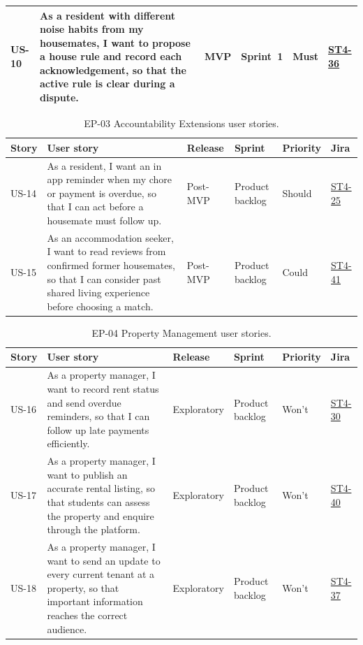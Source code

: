 \documentclass[11pt,a4paper]{article}
\begin{document}
\begin{table}[H]
\begin{tabularx}{\textwidth}{@{}L{1.05cm}Y L{1.75cm}L{1.7cm}L{1.2cm}L{1.1cm}@{}}
        US-10 & As a resident with different noise habits from my housemates, I want to propose a house rule and record each acknowledgement, so that the active rule is clear during a dispute. & MVP & Sprint~1 & Must & \href{https://unsw-team-desn-seng2026.atlassian.net/browse/ST4-36}{ST4-36}\\
        \bottomrule
    \end{tabularx}
    \label{tabstoriesep02}
\end{table}

\begin{table}[H]
    \centering
    \footnotesize
    \caption{EP-03 Accountability Extensions user stories.}
    \begin{tabularx}{\textwidth}{@{}L{1.05cm}Y L{1.75cm}L{1.7cm}L{1.2cm}L{1.1cm}@{}}
        \toprule
        Story & User story & Release & Sprint & Priority & Jira\\
        \midrule
        US-14 & As a resident, I want an in app reminder when my chore or payment is overdue, so that I can act before a housemate must follow up. & Post-MVP & Product backlog & Should & \href{https://unsw-team-desn-seng2026.atlassian.net/browse/ST4-25}{ST4-25}\\
        US-15 & As an accommodation seeker, I want to read reviews from confirmed former housemates, so that I can consider past shared living experience before choosing a match. & Post-MVP & Product backlog & Could & \href{https://unsw-team-desn-seng2026.atlassian.net/browse/ST4-41}{ST4-41}\\
        \bottomrule
    \end{tabularx}
    \label{tabstoriesep03}
\end{table}

\begin{table}[H]
    \centering
    \footnotesize
    \caption{EP-04 Property Management user stories.}
    \begin{tabularx}{\textwidth}{@{}L{1.05cm}Y L{1.75cm}L{1.7cm}L{1.2cm}L{1.1cm}@{}}
        \toprule
        Story & User story & Release & Sprint & Priority & Jira\\
        \midrule
        US-16 & As a property manager, I want to record rent status and send overdue reminders, so that I can follow up late payments efficiently. & Exploratory & Product backlog & Won't & \href{https://unsw-team-desn-seng2026.atlassian.net/browse/ST4-30}{ST4-30}\\
        US-17 & As a property manager, I want to publish an accurate rental listing, so that students can assess the property and enquire through the platform. & Exploratory & Product backlog & Won't & \href{https://unsw-team-desn-seng2026.atlassian.net/browse/ST4-40}{ST4-40}\\
        US-18 & As a property manager, I want to send an update to every current tenant at a property, so that important information reaches the correct audience. & Exploratory & Product backlog & Won't & \href{https://unsw-team-desn-seng2026.atlassian.net/browse/ST4-37}{ST4-37}\\
        \bottomrule
    \end{tabularx}
    \label{tabstoriesep04}
\end{table}
\end{document}
